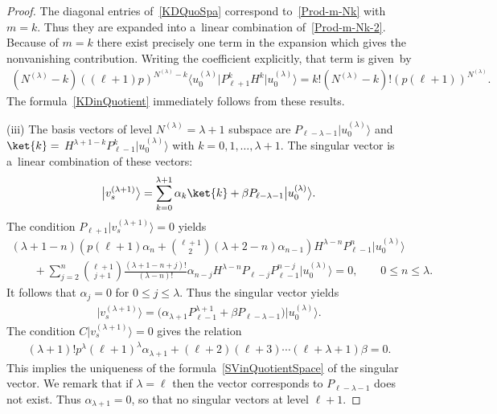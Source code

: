\begin{proof}
The diagonal entries of~\eqref{KDQuoSpa} correspond to~\eqref{Prod-m-Nk} with $ m = k$.
Thus they are expanded into a~linear combination of~\eqref{Prod-m-Nk-2}.
Because of $ m = k $ there exist precisely one term in the expansion which gives the nonvanishing contribution.
Writing the coef\/f\/icient explicitly, that term is given~by
\begin{gather*}
(N^{(\lambda)}-k) ((\ell+1) p)^{N^{(\lambda)}-k} \big\langle u_0^{(\lambda)}\big| P_{\ell+1}^k H^k \big|u_0^{(\lambda)}\big\rangle  = k!
(N^{(\lambda)}-k)!   (p  (\ell+1))^{N^{(\lambda)}}.
\end{gather*}
The formula~\eqref{KDinQuotient} immediately follows from these results.

 (iii) The basis vectors of level $ N^{(\lambda)} = \lambda + 1 $ subspace are $ P_{\ell-\lambda-1}
\big|u_0^{(\lambda)}\big\rangle  $ and $ \ket{k} =$ \linebreak  $H^{\lambda+1-k}   P_{\ell-1}^k \big|u_0^{(\lambda)}\big\rangle$ with $
k=0,1,\dots,\lambda+1$.
The singular vector is a~linear combination of these vectors:
\begin{gather*}
\big|v_s^{(\lambda+1)}\big\rangle  = \sum\limits_{k=0}^{\lambda+1} \alpha_k \ket{k} + \beta P_{\ell-\lambda-1}
\big|u_0^{(\lambda)}\big\rangle .
\end{gather*}
The condition $ P_{\ell+1} \big|v_s^{(\lambda+1)}\big\rangle  = 0 $ yields
\begin{gather*}
    (\lambda+1-n) \left(  p (\ell+1)  \alpha_n + \binom{\ell+1}{2} (\lambda+2-n) \alpha_{n-1} \right) H^{\lambda-n}
P_{\ell-1}^n \big|u_0^{(\lambda)}\big\rangle
\\
\qquad{}
+ \sum\limits_{j=2}^n \binom{\ell+1}{j+1} \frac{(\lambda+1-n+j)!}{(\lambda-n)!}   \alpha_{n-j} H^{\lambda-n} P_{\ell-j}
P_{\ell-1}^{n-j} \big|u_0^{(\lambda)}\big\rangle  = 0,
\qquad
0 \leq n \leq \lambda.
\end{gather*}
It follows that $ \alpha_j = 0 $ for $ 0 \leq j \leq \lambda$.
Thus the singular vector yields
\begin{gather*}
\big|v_s^{(\lambda+1)}\big\rangle  = \big(  \alpha_{\lambda+1} P_{\ell-1}^{\lambda+1} + \beta P_{\ell-\lambda-1}  \big)
\big|u_0^{(\lambda)}\big\rangle .
\end{gather*}
The condition $ C \big|v_s^{(\lambda+1)}\big\rangle  = 0 $ gives the relation
\begin{gather*}
(\lambda+1)!  p^{\lambda} (\ell+1)^{\lambda} \alpha_{\lambda+1} + (\ell+2) (\ell+3) \cdots (\ell+\lambda+1) \beta = 0.
\end{gather*}
This implies the uniqueness of the formula~\eqref{SVinQuotientSpace} of the singular vector.
We remark that if $ \lambda=\ell $ then the vector corresponds to $ P_{\ell-\lambda-1} $ does not exist.
Thus $ \alpha_{\lambda+1} = 0 $, so that no singular vectors at level $ \ell+1$.
\end{proof}

